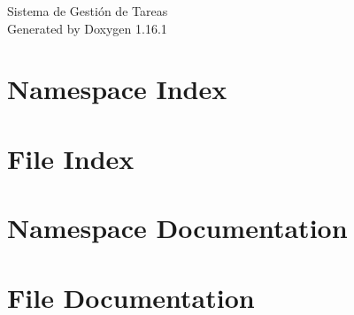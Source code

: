 \documentclass[twoside]{book}
\newcommand{\+}{\discretionary{\mbox{\scriptsize$\hookleftarrow$}}{}{}}
\newcommand{\clearemptydoublepage}{%
    \newpage{\pagestyle{empty}\cleardoublepage}%
  }
\begin{document}
  \raggedbottom
    \hypersetup{pageanchor=false,
                bookmarksnumbered=true,
                pdfencoding=unicode
               }
  \begin{titlepage}
  \vspace*{7cm}
  \begin{center}%
  {\Large Sistema de Gestión de Tareas}\\
  \vspace*{1cm}
  {\large Generated by Doxygen 1.16.1}\\
  \end{center}
  \end{titlepage}
  \clearemptydoublepage
  \tableofcontents
  \clearemptydoublepage
  \hypersetup{pageanchor=true}
\chapter{Namespace Index}

\chapter{File Index}

\chapter{Namespace Documentation}




\chapter{File Documentation}




  \backmatter
  \newpage
  \clearemptydoublepage
  \printindex
\end{document}

